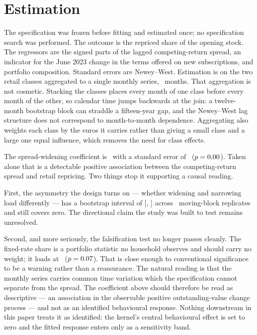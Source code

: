 \documentclass[11pt,a4paper]{article}
\begin{document}
\section{Estimation}
\label{sec:estimation}

The specification was frozen before fitting and estimated once; no
specification search was performed. The outcome is the repriced share of the
opening stock. The regressors are the signed parts of the lagged
competing-return spread, an indicator for the June 2023 change in the terms
offered on new subscriptions, and portfolio composition. Standard errors are
Newey--West. Estimation is on the two retail classes aggregated to a single
monthly series, \EstimationObservations\ months. That aggregation is not
cosmetic. Stacking the classes places every month of one class before every
month of the other, so calendar time jumps backwards at the join: a
twelve-month bootstrap block can straddle a fifteen-year gap, and the
Newey--West lag structure does not correspond to month-to-month dependence.
Aggregating also weights each class by the euros it carries rather than giving
a small class and a large one equal influence, which removes the need for class
effects.

The spread-widening coefficient is \SpreadWideningCoef\ with a standard error
of \SpreadWideningSe\ ($p = 0.00$). Taken alone that is a
detectable positive association between the competing-return spread and retail
repricing. Two things stop it supporting a causal reading.

First, the asymmetry the design turns on --- whether widening and narrowing
load differently --- has a bootstrap interval of [\AsymmetryLow,
\AsymmetryHigh] across \BootstrapReplicates\ moving-block replicates and still
covers zero. The directional claim the study was built to test remains
unresolved.

Second, and more seriously, the falsification test no longer passes cleanly.
The fixed-rate share is a portfolio statistic no household observes and should
carry no weight; it loads at \PlaceboCoef\ ($p = 0.07$). That is close
enough to conventional significance to be a warning rather than a reassurance.
The natural reading is that the monthly series carries common time variation
which the specification cannot separate from the spread. The coefficient above
should therefore be read as descriptive --- an association in the observable
positive outstanding-value change process --- and not as an identified
behavioural response. Nothing downstream in this paper treats it as identified:
the kernel's central behavioural effect is set to zero and the fitted response
enters only as a sensitivity band.
\end{document}
